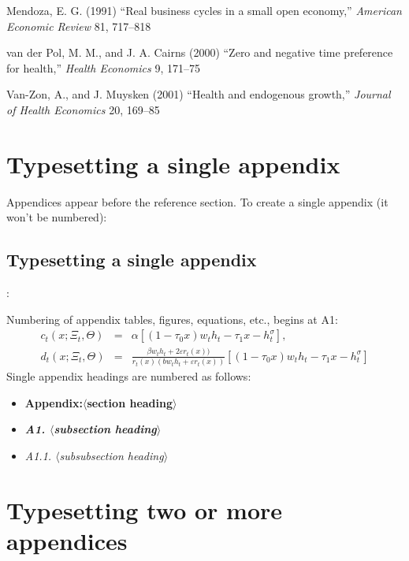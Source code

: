 \documentclass{cje}          %
\theoremstyle{plain}%
\theoremstyle{definition}
\theoremstyle{remark}
\begin{document}
\begin{smallverbatim}
\begin{thebibliography}{10}
Mendoza, E. G. (1991) \enquote{Real business cycles in a small open economy,}
  \emph{American Economic Review} 81, 717--818

van der Pol, M. M., and J. A. Cairns (2000) \enquote{Zero and negative time
  preference for health,} \emph{Health Economics} 9, 171--75

Van-Zon, A., and J. Muysken (2001) \enquote{Health and endogenous growth,}
  \emph{Journal of Health Economics} 20, 169--85

\end{thebibliography}
\end{smallverbatim}

\appendix

\section{Typesetting a single appendix}
\label{single}

Appendices appear before the reference section. To create a single appendix (it won't be numbered):
\begin{smallverbatim}
\oneappendix
\section{Typesetting a single appendix}
  :
\end{smallverbatim}
Numbering of appendix tables, figures, equations, etc., begins at A1:
\begin{eqnarray}
\label{appeqnone}
 c_t(x;\Xi_t,\Theta) &=& \alpha[(1-\tau_0x)w_th_t - \tau_1x - h_t^\sigma],\nonumber\\[3pt]
 d_t(x;\Xi_t,\Theta) &=& \frac{\beta w_t h_t + 2\varepsilon r_t(x))}{r_t(x)(bw_t h_t + \varepsilon r_t(x))} 
 \left[(1-\tau_0 x)w_t h_t - \tau_1 x -h_t^\sigma\right]
\end{eqnarray}
Single appendix headings are numbered as follows:
\begin{itemize}
  \item \textbf{Appendix:\enskip $\langle$section heading$\rangle$}
  \item {\bfseries\textit{A1. $\langle$subsection heading$\rangle$}} 
  \item \textit{A1.1. $\langle$subsubsection heading$\rangle$}
\end{itemize}

\section{Typesetting two or more appendices}
\label{multiple}
\end{document}
